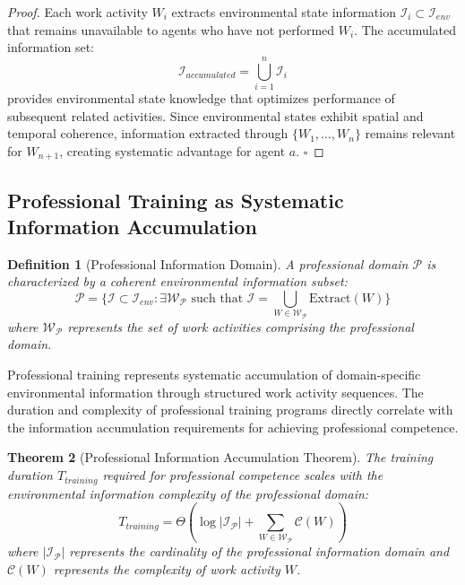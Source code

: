 \documentclass[12pt,a4paper]{article}
\newtheorem{theorem}{Theorem}
\newtheorem{definition}[theorem]{Definition}
\begin{document}
\begin{proof}
Each work activity $W_i$ extracts environmental state information $\mathcal{I}_i \subset \mathcal{I}_{env}$ that remains unavailable to agents who have not performed $W_i$. The accumulated information set:
\begin{equation}
\mathcal{I}_{accumulated} = \bigcup_{i=1}^n \mathcal{I}_i
\end{equation}
provides environmental state knowledge that optimizes performance of subsequent related activities. Since environmental states exhibit spatial and temporal coherence, information extracted through $\{W_1, \ldots, W_n\}$ remains relevant for $W_{n+1}$, creating systematic advantage for agent $a$. $\square$
\end{proof}

\subsection{Professional Training as Systematic Information Accumulation}

\begin{definition}[Professional Information Domain]
A professional domain $\mathcal{P}$ is characterized by a coherent environmental information subset:
\begin{equation}
\mathcal{P} = \{\mathcal{I} \subset \mathcal{I}_{env} : \exists \mathcal{W}_{\mathcal{P}} \text{ such that } \mathcal{I} = \bigcup_{W \in \mathcal{W}_{\mathcal{P}}} \text{Extract}(W)\}
\end{equation}
where $\mathcal{W}_{\mathcal{P}}$ represents the set of work activities comprising the professional domain.
\end{definition}

Professional training represents systematic accumulation of domain-specific environmental information through structured work activity sequences. The duration and complexity of professional training programs directly correlate with the information accumulation requirements for achieving professional competence.

\begin{theorem}[Professional Information Accumulation Theorem]
The training duration $T_{training}$ required for professional competence scales with the environmental information complexity of the professional domain:
\begin{equation}
T_{training} = \Theta\left(\log|\mathcal{I}_{\mathcal{P}}| + \sum_{W \in \mathcal{W}_{\mathcal{P}}} \mathcal{C}(W)\right)
\end{equation}
where $|\mathcal{I}_{\mathcal{P}}|$ represents the cardinality of the professional information domain and $\mathcal{C}(W)$ represents the complexity of work activity $W$.
\end{theorem}
\end{document}
